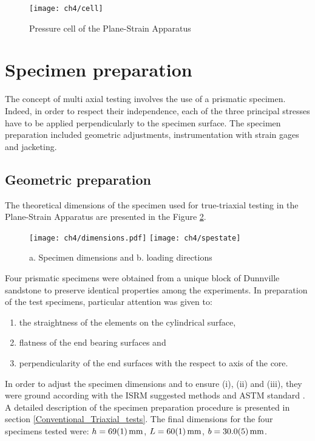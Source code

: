 \begin{figure}[tb]
    \centering
    \texttt{[image: ch4/cell]}
    \caption{Pressure cell of the Plane-Strain Apparatus}
    \label{fig4:4}
\end{figure} 

\section{Specimen preparation}

The concept of multi axial testing involves the use of a prismatic specimen. Indeed, in order to respect their independence, each of the three principal stresses have to be applied perpendicularly to the specimen surface. The specimen preparation included geometric adjustments, instrumentation with strain gages and jacketing. 

\subsection{Geometric preparation}

The theoretical dimensions of the specimen used for true-triaxial testing in the Plane-Strain Apparatus are presented in the Figure \ref{fig4:5}. 

\begin{figure}[tb]
    \centering
    \texttt{[image: ch4/dimensions.pdf]}
    \texttt{[image: ch4/spestate]}
    \caption{a. Specimen dimensions and b. loading directions}
    \label{fig4:5}
\end{figure} 

Four prismatic specimens were obtained from a unique block of Dunnville sandstone to preserve identical properties among the experiments. In preparation of the test specimens, particular attention was given to:

\begin{enumerate}[i]
    \item the straightness of the elements on the cylindrical surface, 
    \item flatness of the end bearing surfaces and
    \item perpendicularity of the end surfaces with the respect to axis of the core. 
\end{enumerate}

 In order to adjust the specimen dimensions and to ensure (i), (ii) and (iii), they were ground according with the ISRM suggested methods \cite{ISRM2015} and ASTM standard \cite{ASTM2019}. A detailed description of the specimen preparation procedure is presented in section \ref{Conventional_Triaxial_tests}. The final dimensions for the four specimens tested were: $h=\SI{69+-1}{\milli\meter}$, $L=\SI{60+-1}{\milli\meter}$, 
$b=\SI{30+-0.5}{\milli\meter}$.

